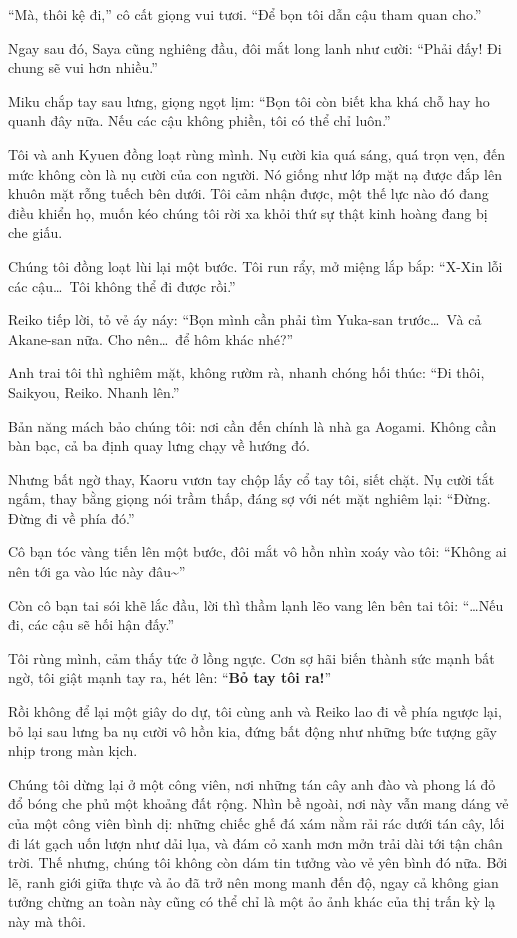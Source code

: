 \documentclass[../main.tex]{subfiles}
\begin{document}
``Mà, thôi kệ đi,'' cô cất giọng vui tươi. ``Để bọn tôi dẫn cậu tham quan cho.''

Ngay sau đó, Saya cũng nghiêng đầu, đôi mắt long lanh như cười: ``Phải đấy! Đi chung sẽ vui hơn nhiều.''

Miku chắp tay sau lưng, giọng ngọt lịm: ``Bọn tôi còn biết kha khá chỗ hay ho quanh đây nữa. Nếu các cậu không phiền, tôi có thể chỉ luôn.''


Tôi và anh Kyuen đồng loạt rùng mình. Nụ cười kia quá sáng, quá trọn vẹn, đến mức không còn là nụ cười của con người. Nó giống như lớp mặt nạ được đắp lên khuôn mặt rỗng tuếch bên dưới. Tôi cảm nhận được, một thế lực nào đó đang điều khiển họ, muốn kéo chúng tôi rời xa khỏi thứ sự thật kinh hoàng đang bị che giấu.

Chúng tôi đồng loạt lùi lại một bước. Tôi run rẩy, mở miệng lắp bắp: ``X-Xin lỗi các cậu\dots\ Tôi không thể đi được rồi.''

Reiko tiếp lời, tỏ vẻ áy náy: ``Bọn mình cần phải tìm Yuka-san trước\dots\ Và cả Akane-san nữa. Cho nên\dots\ để hôm khác nhé?''

Anh trai tôi thì nghiêm mặt, không rườm rà, nhanh chóng hối thúc: ``Đi thôi, Saikyou, Reiko. Nhanh lên.''

Bản năng mách bảo chúng tôi: nơi cần đến chính là nhà ga Aogami. Không cần bàn bạc, cả ba định quay lưng chạy về hướng đó.

Nhưng bất ngờ thay, Kaoru vươn tay chộp lấy cổ tay tôi, siết chặt. Nụ cười tắt ngấm, thay bằng giọng nói trầm thấp, đáng sợ với nét mặt nghiêm lại: ``Đừng. Đừng đi về phía đó.''


Cô bạn tóc vàng tiến lên một bước, đôi mắt vô hồn nhìn xoáy vào tôi: ``Không ai nên tới ga vào lúc này đâu\~{}''

Còn cô bạn tai sói khẽ lắc đầu, lời thì thầm lạnh lẽo vang lên bên tai tôi: ``\dots Nếu đi, các cậu sẽ hối hận đấy.''

Tôi rùng mình, cảm thấy tức ở lồng ngực. Cơn sợ hãi biến thành sức mạnh bất ngờ, tôi giật mạnh tay ra, hét lên: ``\textbf{Bỏ tay tôi ra!}''

Rồi không để lại một giây do dự, tôi cùng anh và Reiko lao đi về phía ngược lại, bỏ lại sau lưng ba nụ cười vô hồn kia, đứng bất động như những bức tượng gãy nhịp trong màn kịch.

\ct

Chúng tôi dừng lại ở một công viên, nơi những tán cây anh đào và phong lá đỏ đổ bóng che phủ một khoảng đất rộng. Nhìn bề ngoài, nơi này vẫn mang dáng vẻ của một công viên bình dị: những chiếc ghế đá xám nằm rải rác dưới tán cây, lối đi lát gạch uốn lượn như dải lụa, và đám cỏ xanh mơn mởn trải dài tới tận chân trời. Thế nhưng, chúng tôi không còn dám tin tưởng vào vẻ yên bình đó nữa. Bởi lẽ, ranh giới giữa thực và ảo đã trở nên mong manh đến độ, ngay cả không gian tưởng chừng an toàn này cũng có thể chỉ là một ảo ảnh khác của thị trấn kỳ lạ này mà thôi.
\end{document}
